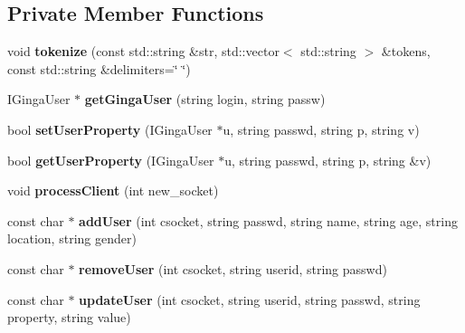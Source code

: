\subsection*{Private Member Functions}
\begin{CompactItemize}
\item 
void {\bf tokenize} (const std::string \&str, std::vector$<$ std::string $>$ \&tokens, const std::string \&delimiters=\char`\"{} \char`\"{})\label{classbr_1_1pucrio_1_1telemidia_1_1ginga_1_1ncl_1_1adaptation_1_1context_1_1AuthenticationServer_5362ae4f674bd00596e2dec26d474384}

\item 
IGingaUser $\ast$ \textbf{getGingaUser} (string login, string passw)\label{classbr_1_1pucrio_1_1telemidia_1_1ginga_1_1ncl_1_1adaptation_1_1context_1_1AuthenticationServer_e4787c5656ccf464dbbaf275e385f67c}

\item 
bool \textbf{setUserProperty} (IGingaUser $\ast$u, string passwd, string p, string v)\label{classbr_1_1pucrio_1_1telemidia_1_1ginga_1_1ncl_1_1adaptation_1_1context_1_1AuthenticationServer_d7a3ec803f407ca9371a75611655ce21}

\item 
bool \textbf{getUserProperty} (IGingaUser $\ast$u, string passwd, string p, string \&v)\label{classbr_1_1pucrio_1_1telemidia_1_1ginga_1_1ncl_1_1adaptation_1_1context_1_1AuthenticationServer_9b5014642a3cd00a7c8cd9e792820ee5}

\item 
void \textbf{processClient} (int new\_\-socket)\label{classbr_1_1pucrio_1_1telemidia_1_1ginga_1_1ncl_1_1adaptation_1_1context_1_1AuthenticationServer_dedf7e05eedaaee65ce269bf96661d2d}

\item 
const char $\ast$ \textbf{addUser} (int csocket, string passwd, string name, string age, string location, string gender)\label{classbr_1_1pucrio_1_1telemidia_1_1ginga_1_1ncl_1_1adaptation_1_1context_1_1AuthenticationServer_d3b5dee15f3d7cd45bf3ef89ae69e3ff}

\item 
const char $\ast$ \textbf{removeUser} (int csocket, string userid, string passwd)\label{classbr_1_1pucrio_1_1telemidia_1_1ginga_1_1ncl_1_1adaptation_1_1context_1_1AuthenticationServer_ce2ff089ba24fb08cd806580a3a25251}

\item 
const char $\ast$ \textbf{updateUser} (int csocket, string userid, string passwd, string property, string value)\label{classbr_1_1pucrio_1_1telemidia_1_1ginga_1_1ncl_1_1adaptation_1_1context_1_1AuthenticationServer_3d07fbcdd2a0ed72b42e0c1aef556c25}


\end{CompactItemize}
